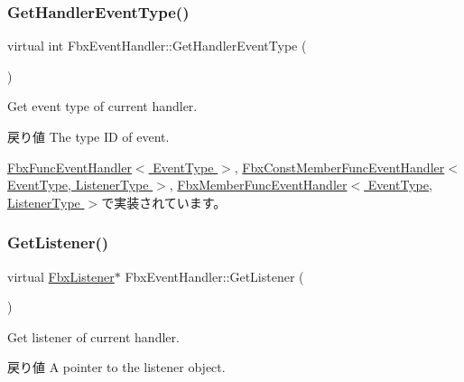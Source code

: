 \mbox{\label{class_fbx_event_handler_a0b42d2b93e63d866975f468a481c9f3c}} 
\subsubsection{\texorpdfstring{Get\+Handler\+Event\+Type()}{GetHandlerEventType()}}
{\footnotesize\ttfamily virtual int Fbx\+Event\+Handler\+::\+Get\+Handler\+Event\+Type (\begin{DoxyParamCaption}{ }\end{DoxyParamCaption})\hspace{0.3cm}{\ttfamily [pure virtual]}}

Get event type of current handler. \begin{DoxyReturn}{戻り値}
The type ID of event. 
\end{DoxyReturn}


\hyperlink{class_fbx_func_event_handler_a0c1a0eaedda70615a684bd96aa72fb97}{Fbx\+Func\+Event\+Handler$<$ Event\+Type $>$}, \hyperlink{class_fbx_const_member_func_event_handler_ac88157f51fa72cba959f31dfbcdee4a5}{Fbx\+Const\+Member\+Func\+Event\+Handler$<$ Event\+Type, Listener\+Type $>$}, \hyperlink{class_fbx_member_func_event_handler_a57856423663f283503e6498a7eacb0b4}{Fbx\+Member\+Func\+Event\+Handler$<$ Event\+Type, Listener\+Type $>$}で実装されています。

\mbox{\label{class_fbx_event_handler_a6d496102fe1253372bb042840c2d45a7}} 
\subsubsection{\texorpdfstring{Get\+Listener()}{GetListener()}}
{\footnotesize\ttfamily virtual \hyperlink{class_fbx_listener}{Fbx\+Listener}$\ast$ Fbx\+Event\+Handler\+::\+Get\+Listener (\begin{DoxyParamCaption}{ }\end{DoxyParamCaption})\hspace{0.3cm}{\ttfamily [pure virtual]}}

Get listener of current handler. \begin{DoxyReturn}{戻り値}
A pointer to the listener object. 
\end{DoxyReturn}


